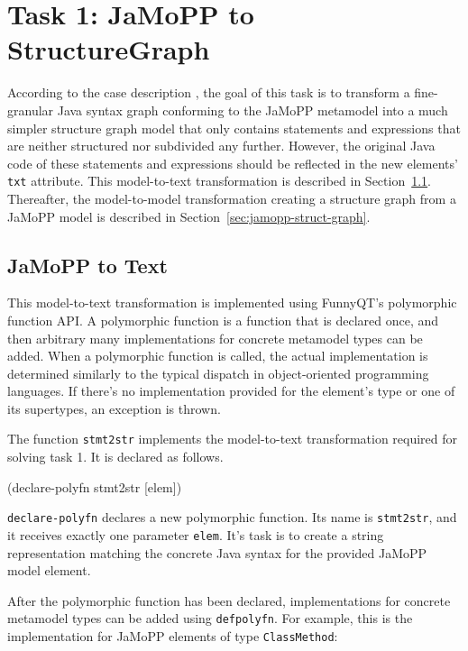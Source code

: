 \documentclass[11pt]{article}
\begin{document}
\section{Task 1: JaMoPP to StructureGraph}
\label{sec:task-1}

According to the case description \cite{flowgraphcasedesc}, the goal of this
task is to transform a fine-granular Java syntax graph conforming to the JaMoPP
metamodel \cite{jamopp09} into a much simpler structure graph model that only
contains statements and expressions that are neither structured nor subdivided
any further.  However, the original Java code of these statements and
expressions should be reflected in the new elements' \verb|txt| attribute.
This model-to-text transformation is described in
Section~\ref{sec:jamopp-text}.  Thereafter, the model-to-model transformation
creating a structure graph from a JaMoPP model is described in
Section~\ref{sec:jamopp-struct-graph}.


\subsection{JaMoPP to Text}
\label{sec:jamopp-text}

This model-to-text transformation is implemented using FunnyQT's polymorphic
function API.  A polymorphic function is a function that is declared once, and
then arbitrary many implementations for concrete metamodel types can be added.
When a polymorphic function is called, the actual implementation is determined
similarly to the typical dispatch in object-oriented programming languages.  If
there's no implementation provided for the element's type or one of its
supertypes, an exception is thrown.

The function \verb|stmt2str| implements the model-to-text transformation
required for solving task 1.  It is declared as follows.

\begin{clojurecode}
(declare-polyfn stmt2str [elem])
\end{clojurecode}

\verb|declare-polyfn| declares a new polymorphic function.  Its name is
\verb|stmt2str|, and it receives exactly one parameter \verb|elem|.  It's task
is to create a string representation matching the concrete Java syntax for the
provided JaMoPP model element.

After the polymorphic function has been declared, implementations for concrete
metamodel types can be added using \verb|defpolyfn|.  For example, this is the
implementation for JaMoPP elements of type \verb|ClassMethod|:
\end{document}

